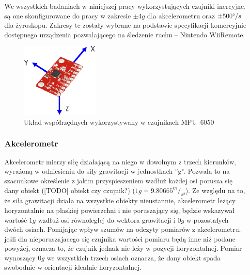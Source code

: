 	We wszystkich badaniach w niniejszej pracy wykorzystujących czujniki inercyjne, są one skonfigurowane do pracy w zakresie  $\pm4g$ dla akcelerometru oraz $\pm500\degree/s$dla żyroskopu. Zakresy te zostały wybrane na podstawie specyfikacji komercyjnie dostępnego urządzenia pozwalającego na śledzenie ruchu -- Nintendo WiiRemote.
		
	\begin{figure}[!htp]
		\centering 
		\includegraphics[width=0.35\textwidth]{images/imuCoordinationSpace.eps}	
		\caption{Układ współrzędnych wykorzystywany w czujnikach MPU--6050}
		\label{fig:characteristics:imu:space}
	\end{figure}
		
		
	\subsubsection*{Akcelerometr}
	Akcelerometr mierzy siłę działającą na niego w dowolnym z trzech kierunków, wyrażoną w odniesieniu do siły grawitacji w jednostkach ''g''. Pozwala to na szacunkowe określenie z jakim przyspieszeniem wzdłuż każdej osi porusza się dany obiekt ([TODO] obiekt czy czujnik?) ($1g =9.80665^m/_{s^2}$). Ze względu na to, że siła grawitacji działa na wszystkie obiekty nieustannie, akcelerometr leżący horyzontalnie na płaskiej powierzchni i nie poruszający się, będzie wskazywał wartość $1g$ wzdłuż osi równoległej do wektora grawitacji i $0g$ w pozostałych dwóch osiach. Pomijając wpływ szumów na odczyty pomiarów z akcelerometru, jeśli dla nieporuszajacego się czujnika wartości pomiaru będą inne niż podane powyżej, oznacza to, że czujnik jednak nie leży w pozycji horyzontalnej. Pomiar wynoszący $0g$ we wszystkich trzech osiach oznacza, że dany obiekt spada swobodnie w orientacji idealnie horyzontalnej.\\
		
